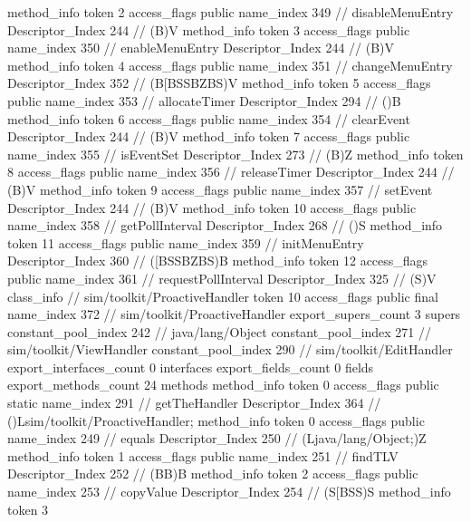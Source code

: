 {{{{{				}
				method_info {
					token	2
					access_flags	public
					name_index	349		// disableMenuEntry
					Descriptor_Index	244		// (B)V
				}
				method_info {
					token	3
					access_flags	public
					name_index	350		// enableMenuEntry
					Descriptor_Index	244		// (B)V
				}
				method_info {
					token	4
					access_flags	public
					name_index	351		// changeMenuEntry
					Descriptor_Index	352		// (B[BSSBZBS)V
				}
				method_info {
					token	5
					access_flags	public
					name_index	353		// allocateTimer
					Descriptor_Index	294		// ()B
				}
				method_info {
					token	6
					access_flags	public
					name_index	354		// clearEvent
					Descriptor_Index	244		// (B)V
				}
				method_info {
					token	7
					access_flags	public
					name_index	355		// isEventSet
					Descriptor_Index	273		// (B)Z
				}
				method_info {
					token	8
					access_flags	public
					name_index	356		// releaseTimer
					Descriptor_Index	244		// (B)V
				}
				method_info {
					token	9
					access_flags	public
					name_index	357		// setEvent
					Descriptor_Index	244		// (B)V
				}
				method_info {
					token	10
					access_flags	public
					name_index	358		// getPollInterval
					Descriptor_Index	268		// ()S
				}
				method_info {
					token	11
					access_flags	public
					name_index	359		// initMenuEntry
					Descriptor_Index	360		// ([BSSBZBS)B
				}
				method_info {
					token	12
					access_flags	public
					name_index	361		// requestPollInterval
					Descriptor_Index	325		// (S)V
				}
			}
		}
		class_info {		// sim/toolkit/ProactiveHandler
			token	10
			access_flags	public final
			name_index	372		// sim/toolkit/ProactiveHandler
			export_supers_count	3
			supers {
				constant_pool_index	242		// java/lang/Object
				constant_pool_index	271		// sim/toolkit/ViewHandler
				constant_pool_index	290		// sim/toolkit/EditHandler
			}
			export_interfaces_count	0
			interfaces {
			}
			export_fields_count	0
			fields {
			}
			export_methods_count	24
			methods {
				method_info {
					token	0
					access_flags	public static
					name_index	291		// getTheHandler
					Descriptor_Index	364		// ()Lsim/toolkit/ProactiveHandler;
				}
				method_info {
					token	0
					access_flags	public
					name_index	249		// equals
					Descriptor_Index	250		// (Ljava/lang/Object;)Z
				}
				method_info {
					token	1
					access_flags	public
					name_index	251		// findTLV
					Descriptor_Index	252		// (BB)B
				}
				method_info {
					token	2
					access_flags	public
					name_index	253		// copyValue
					Descriptor_Index	254		// (S[BSS)S
				}
				method_info {
					token	3
}}}}}
